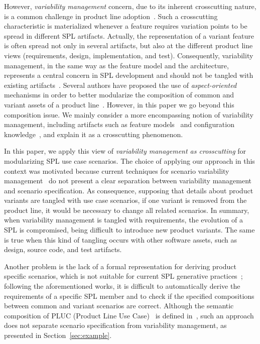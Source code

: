 \documentclass{report}
\begin{document}
\begin{frontmatter}
However, \emph{variability management} concern, due to its inherent crosscutting
nature, is a common challenge in product line
adoption~\cite{northrop-spl-book,phol-spl-book}. Such a crosscutting
characteristic is materialized whenever a feature requires variation points to be
spread in different SPL artifacts. Actually, the representation of a variant
feature is often spread not only in several artifacts, but also at the different
product line views (requirements, design, implementation, and test).
Consequently, variability management, in the same way as the feature model and
the architecture, represents a central concern in SPL development and should not
be tangled with existing artifacts~\cite{phol-spl-book}.
 Several authors have proposed the use of \emph{aspect-oriented} mechanisms in
 order to better modularize the composition of common and variant assets of a
 product line~\cite{ moreira-re07, eriksson-splc-2005,
 alves-gpce-06, apel-icse2006}.
However, in this paper we go beyond this composition issue. We mainly consider a
more encompassing notion of variability management, including artifacts such as
feature models~\cite{gheyi-alloy-06,czarnecki-book} and configuration
knowledge~\cite{czarnecki-book, phol-spl-book}, and explain it  as a crosscutting
phenomenon.

In this paper, we apply this view of \emph{variability management as
crosscutting} for modularizing SPL use case scenarios. The choice of applying our
approach in this context was motivated because current techniques for scenario
variability
management~\cite{favaro-icsr-98,bertolino-esec-2003,eriksson-splc-2005} do not
present a clear separation between variability management and scenario
specification. As consequence, supposing that details about product variants are
tangled with  use case scenarios, if one variant is removed from the product
line, it would be necessary to change all related scenarios. In summary, when
variability management is tangled with requirements, the evolution of a SPL is
compromised, being difficult to introduce new product variants. The same is true
when this kind of tangling occurs with other software assets, such as design,
source code, and test artifacts.

Another problem is the lack of a formal representation for deriving product
specific scenarios, which is not suitable for current SPL generative
practices~\cite{krueger-cacm-200712}; following the aforementioned works, it is
difficult to automatically derive the requirements of a specific SPL member and
to check if the specified compositions between common and variant scenarios are
correct.  Although  the semantic composition of PLUC (Product Line Use
Case)~\cite{bertolino-esec-2003} is defined in~\cite{fantechi-splc-2004}, such an
approach does not separate scenario specification from variability management, as
presented in Section~\ref{sec:example}.


\end{frontmatter}
\end{document}
